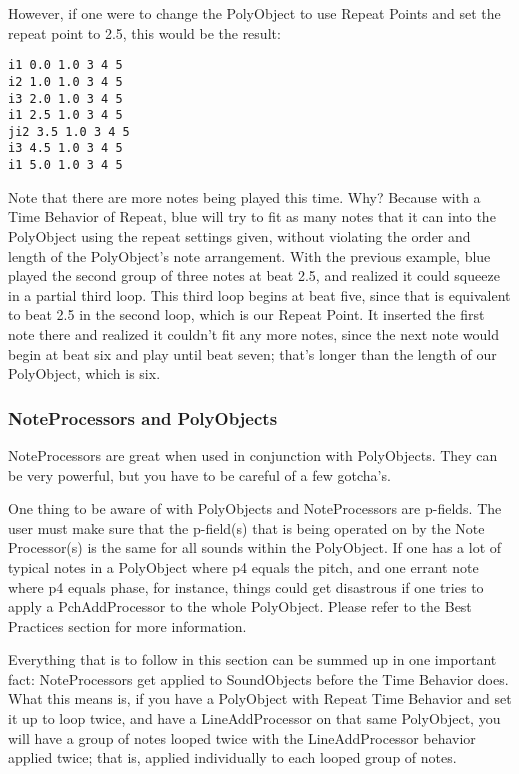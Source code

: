 However, if one were to change the PolyObject to use Repeat Points and
set the repeat point to 2.5, this would be the result:

\begin{verbatim}
i1 0.0 1.0 3 4 5
i2 1.0 1.0 3 4 5
i3 2.0 1.0 3 4 5
i1 2.5 1.0 3 4 5
ji2 3.5 1.0 3 4 5
i3 4.5 1.0 3 4 5
i1 5.0 1.0 3 4 5
\end{verbatim}

Note that there are more notes being played this time. Why? Because with
a Time Behavior of Repeat, blue will try to fit as many notes that it
can into the PolyObject using the repeat settings given, without
violating the order and length of the PolyObject's note arrangement.
With the previous example, blue played the second group of three notes
at beat 2.5, and realized it could squeeze in a partial third loop. This
third loop begins at beat five, since that is equivalent to beat 2.5 in
the second loop, which is our Repeat Point. It inserted the first note
there and realized it couldn't fit any more notes, since the next note
would begin at beat six and play until beat seven; that's longer than
the length of our PolyObject, which is six.

\subsubsection{NoteProcessors and PolyObjects}

NoteProcessors are great when used in conjunction with PolyObjects. They
can be very powerful, but you have to be careful of a few gotcha's.

One thing to be aware of with PolyObjects and NoteProcessors are
p-fields. The user must make sure that the p-field(s) that is being
operated on by the Note Processor(s) is the same for all sounds within
the PolyObject. If one has a lot of typical notes in a PolyObject where
p4 equals the pitch, and one errant note where p4 equals phase, for
instance, things could get disastrous if one tries to apply a
PchAddProcessor to the whole PolyObject. Please refer to the Best
Practices section for more information.

Everything that is to follow in this section can be summed up in one
important fact: NoteProcessors get applied to SoundObjects before the
Time Behavior does. What this means is, if you have a PolyObject with
Repeat Time Behavior and set it up to loop twice, and have a
LineAddProcessor on that same PolyObject, you will have a group of notes
looped twice with the LineAddProcessor behavior applied twice; that is,
applied individually to each looped group of notes.

